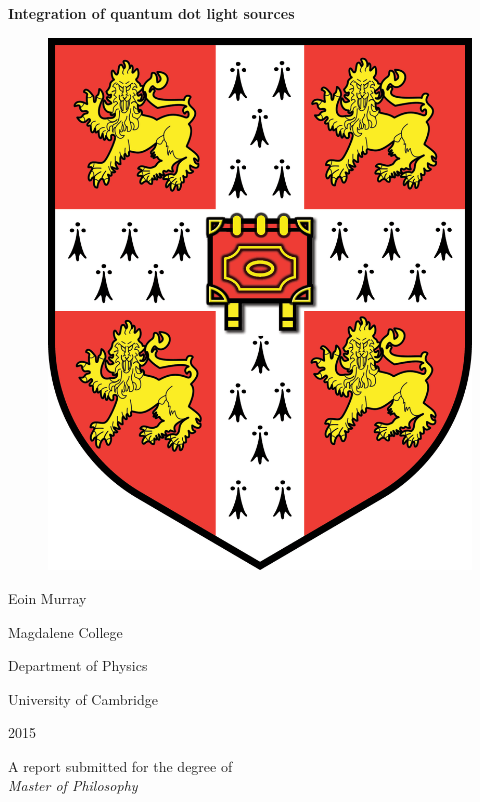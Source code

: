 

\begin{center} \LARGE{\textbf{Integration of quantum dot light sources}}
\end{center}

\vspace{1cm}

\begin{figure}[h] \begin{center}
\includegraphics[scale=0.15]{images/cam_logo.png} \end{center} \end{figure}

\begin{center} \Large{Eoin Murray} \par \normalsize{Magdalene College} \par
\normalsize{Department of Physics} \par \normalsize{University of Cambridge}
\par 2015 \end{center}

\begin{center} A report submitted for the degree of \\ \textit{Master
of Philosophy} \end{center}
